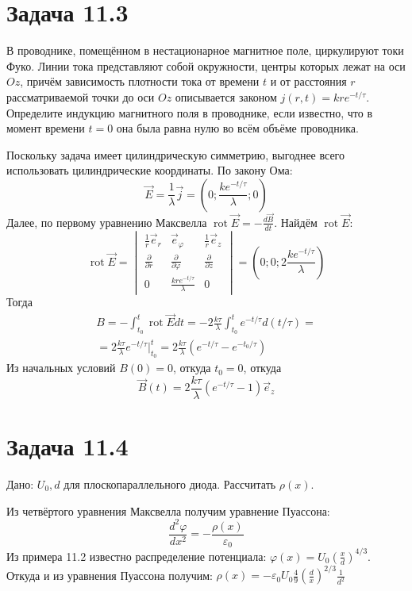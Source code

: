 \documentclass[11pt]{article}
\begin{document}
\section{Задача 11.3}
\label{sec:org93eb38a}
В проводнике, помещённом в нестационарное магнитное поле, циркулируют токи Фуко. Линии тока представляют собой
окружности, центры которых лежат на оси \(Oz\), причём зависимость плотности тока от времени \(t\) и от расстояния
\(r\) рассматриваемой точки до оси \(Oz\) описывается законом \(j(r,t) = kre^{-t/\tau}\). Определите индукцию магнитного
поля в проводнике, если известно, что в момент времени \(t = 0\) она была равна нулю во всём объёме проводника.

Поскольку задача имеет цилиндрическую симметрию, выгоднее всего использовать цилиндрические координаты. По закону
Ома:
$$\vec E = \frac{1}\lambda \vec j = \left(0; \frac{ke^{-t/\tau}}\lambda; 0\right)$$
Далее, по первому уравнению Максвелла \(\operatorname{rot}\vec E = -\frac{d\vec B}{dt}\). Найдём
\(\operatorname{rot}\vec E\):
\begin{equation}
\operatorname{rot}\vec E =
\begin{vmatrix}
\frac{1}r\vec e_r           & \vec e_\varphi                   & \frac{1}r\vec e_z \\
\frac{\partial}{\partial r} & \frac{\partial}{\partial\varphi} & \frac{\partial}{\partial z} \\
0                           & \frac{kre^{-t/\tau}}\lambda       & 0
\end{vmatrix}
= \left(0; 0; 2\frac{ke^{-t/\tau}}\lambda\right)
\end{equation}
Тогда
\begin{multline}
B = -\int_{t_0}^t\operatorname{rot}\vec E dt = -2\frac{k\tau}{\lambda}\int_{t_0}^te^{-t/\tau}d(t/\tau) = \\
= 2\frac{k\tau}{\lambda}e^{-t/\tau}\bigg|_{t_0}^t = 2\frac{k\tau}{\lambda}(e^{-t/\tau} - e^{-t_0/\tau})
\end{multline}
Из начальных условий \(B(0) = 0\), откуда \(t_0 = 0\), откуда
$$\vec B(t) = 2\frac{k\tau}\lambda(e^{-t/\tau} - 1)\vec e_z$$
\section{Задача 11.4}
\label{sec:orgc1fb4c3}
Дано: \(U_0, d\) для плоскопараллельного диода. Рассчитать \(\rho(x)\).

Из четвёртого уравнения Максвелла получим уравнение Пуассона:
$$\frac{d^2\varphi}{dx^2} = -\frac{\rho(x)}{\varepsilon_0}$$
Из примера 11.2 известно распределение потенциала: \(\varphi(x) = U_0\left(\frac{x}d\right)^{4/3}\).
Откуда и из уравнения Пуассона получим: \(\rho(x) = -\varepsilon_0U_0\frac{4}{9}\left(\frac{d}x\right)^{2/3}\frac{1}{d^2}\)
\end{document}
